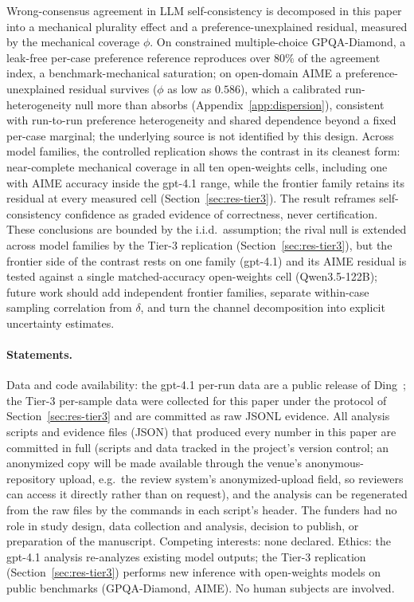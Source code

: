 \documentclass[a4paper,fleqn]{cas-sc}
\begin{document}
Wrong-consensus agreement in LLM self-consistency is decomposed in this paper into a
mechanical plurality effect and a preference-unexplained residual,
measured by the mechanical coverage $\phi$. On constrained
multiple-choice GPQA-Diamond, a leak-free per-case preference reference
reproduces over $80\%$ of the agreement index, a benchmark-mechanical
saturation; on open-domain AIME a preference-unexplained residual
survives ($\phi$ as low as $0.586$), which a calibrated run-heterogeneity
null more than absorbs (Appendix~\ref{app:dispersion}), consistent with
run-to-run preference heterogeneity and shared dependence beyond a fixed
per-case marginal; the underlying source is not identified by this design. Across model families,
the controlled replication shows the contrast in its cleanest form:
near-complete mechanical coverage in all ten open-weights cells,
including one with AIME accuracy inside the gpt-4.1 range, while the frontier
family retains its residual at every measured cell
(Section~\ref{sec:res-tier3}). The result reframes
self-consistency confidence as graded evidence of correctness, never
certification. These conclusions are bounded by the i.i.d.\ assumption;
the rival null is extended across model families by the Tier-3
replication (Section~\ref{sec:res-tier3}), but the frontier side of the
contrast rests on one family (gpt-4.1) and its AIME residual is tested
against a single matched-accuracy open-weights cell
(Qwen3.5-122B); future work should add independent frontier families,
separate within-case sampling correlation from $\delta$, and turn
the channel decomposition into explicit uncertainty estimates.

\paragraph{Statements.}
Data and code availability: the gpt-4.1 per-run data are a public
release of Ding~\cite{ding2026auditing}; the Tier-3 per-sample data were
collected for this paper under the protocol of
Section~\ref{sec:res-tier3} and are committed as raw JSONL evidence.
All analysis scripts and evidence
files (JSON) that produced every number in this paper are committed in full (scripts and data tracked in the project's version control; an anonymized copy will be made available through the venue's anonymous-repository upload, e.g.\ the review system's anonymized-upload field, so reviewers can access it directly rather than on request),
and the analysis can be regenerated from the raw files
 by the commands in each script's header. The funders had no role in study design, data collection
 and analysis, decision to publish, or preparation of the manuscript.
Competing interests: none declared. Ethics: the gpt-4.1 analysis
re-analyzes existing model outputs; the Tier-3 replication
(Section~\ref{sec:res-tier3}) performs new inference with open-weights
models on public benchmarks (GPQA-Diamond, AIME). No human subjects are
involved.
\end{document}
